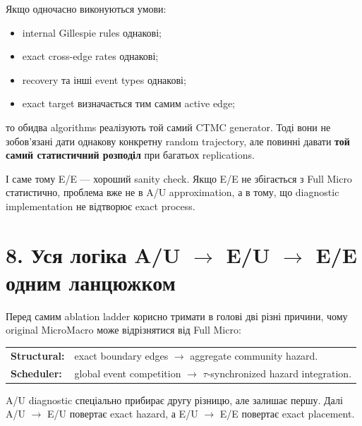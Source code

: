 \documentclass[11pt,a4paper]{article}
\begin{document}
Якщо одночасно виконуються умови:
\begin{itemize}[nosep]
\item internal Gillespie rules однакові;
\item exact cross-edge rates однакові;
\item recovery та інші event types однакові;
\item exact target визначається тим самим active edge;
\end{itemize}
то обидва algorithms реалізують той самий CTMC generator. Тоді вони не зобов'язані дати однакову конкретну random trajectory, але повинні давати \textbf{той самий статистичний розподіл} при багатьох replications.

І саме тому E/E --- хороший sanity check. Якщо E/E не збігається з Full Micro статистично, проблема вже не в A/U approximation, а в тому, що diagnostic implementation не відтворює exact process.

\section*{8. Уся логіка A/U $\to$ E/U $\to$ E/E одним ланцюжком}

Перед самим ablation ladder корисно тримати в голові дві різні причини, чому original MicroMacro може відрізнятися від Full Micro:
\begin{center}
\begin{tabular}{>{\raggedright\arraybackslash}p{29mm} >{\raggedright\arraybackslash}p{112mm}}
\textbf{Structural:} & exact boundary edges $\to$ aggregate community hazard.\\[2pt]
\textbf{Scheduler:} & global event competition $\to$ $\tau$-synchronized hazard integration.
\end{tabular}
\end{center}
A/U diagnostic спеціально прибирає другу різницю, але залишає першу. Далі A/U $\to$ E/U повертає exact hazard, а E/U $\to$ E/E повертає exact placement.
\end{document}
